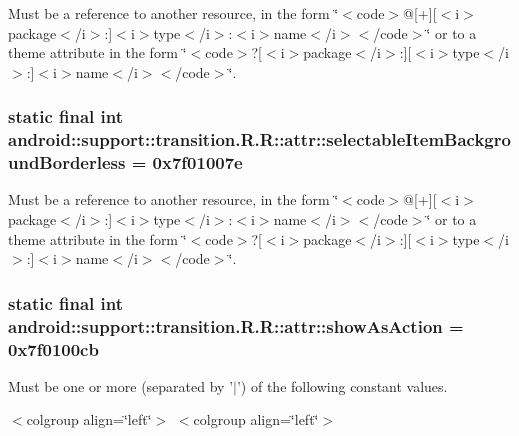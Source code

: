 Must be a reference to another resource, in the form \char`\"{}$<$code$>$@\mbox{[}+\mbox{]}\mbox{[}$<$i$>$package$<$/i$>$:\mbox{]}$<$i$>$type$<$/i$>$:$<$i$>$name$<$/i$>$$<$/code$>$\char`\"{} or to a theme attribute in the form \char`\"{}$<$code$>$?\mbox{[}$<$i$>$package$<$/i$>$:\mbox{]}\mbox{[}$<$i$>$type$<$/i$>$:\mbox{]}$<$i$>$name$<$/i$>$$<$/code$>$\char`\"{}. \hypertarget{classandroid_1_1support_1_1transition_1_1_r_1_1attr_d5e6f6d40ecfa34d2f9b297e27fbe85b}{
\subsubsection[{selectableItemBackgroundBorderless}]{\setlength{\rightskip}{0pt plus 5cm}static final int android::support::transition.R.R::attr::selectableItemBackgroundBorderless = 0x7f01007e}}
\label{classandroid_1_1support_1_1transition_1_1_r_1_1attr_d5e6f6d40ecfa34d2f9b297e27fbe85b}


Must be a reference to another resource, in the form \char`\"{}$<$code$>$@\mbox{[}+\mbox{]}\mbox{[}$<$i$>$package$<$/i$>$:\mbox{]}$<$i$>$type$<$/i$>$:$<$i$>$name$<$/i$>$$<$/code$>$\char`\"{} or to a theme attribute in the form \char`\"{}$<$code$>$?\mbox{[}$<$i$>$package$<$/i$>$:\mbox{]}\mbox{[}$<$i$>$type$<$/i$>$:\mbox{]}$<$i$>$name$<$/i$>$$<$/code$>$\char`\"{}. \hypertarget{classandroid_1_1support_1_1transition_1_1_r_1_1attr_e67cf591e07db80247eefe1c0c24a053}{
\subsubsection[{showAsAction}]{\setlength{\rightskip}{0pt plus 5cm}static final int android::support::transition.R.R::attr::showAsAction = 0x7f0100cb}}
\label{classandroid_1_1support_1_1transition_1_1_r_1_1attr_e67cf591e07db80247eefe1c0c24a053}


Must be one or more (separated by '$|$') of the following constant values. \begin{TabularC}{0}
\hline
\end{TabularC}
$<$colgroup align=\char`\"{}left\char`\"{}$>$ $<$colgroup align=\char`\"{}left\char`\"{}$>$ 

